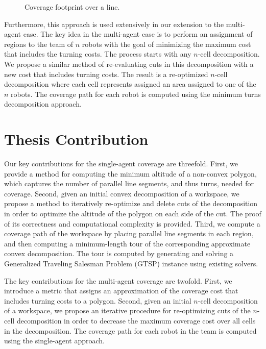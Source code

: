 \documentclass[../main.tex]{subfiles}
\begin{document}
\begin{figure}
	\centering
	
	\caption{Coverage footprint over a line.}
	\label{fig:line_footprint}
\end{figure}

Furthermore, this approach is used extensively in our extension to the multi-agent case. The key idea in the multi-agent case is to perform an assignment of regions to the team of $n$ robots with the goal of minimizing the maximum cost that includes the turning costs. The process starts with any $n$-cell decomposition. We propose a similar method of re-evaluating cuts in this decomposition with a new cost that includes turning costs. The result is a re-optimized $n$-cell decomposition where each cell represents assigned an area assigned to one of the $n$ robots. The coverage path for each robot is computed using the minimum turns decomposition approach.


\section{Thesis Contribution}
\label{section:thesis_contribution}

Our key contributions for the single-agent coverage are threefold. First, we provide a method for computing the minimum altitude of a non-convex polygon, which captures the number of parallel line segments, and thus turns, needed for coverage. Second, given an initial convex decomposition of a workspace, we propose a method to iteratively re-optimize and delete cuts of the decomposition in order to optimize the altitude of the polygon on each side of the cut. The proof of its correctness and computational complexity is provided. Third, we compute a coverage path of the workspace by placing parallel line segments in each region, and then computing a minimum-length tour of the corresponding approximate convex decomposition. The tour is computed by generating and solving a Generalized Traveling Salesman Problem (GTSP) instance using existing solvers.

The key contributions for the multi-agent coverage are twofold. First, we introduce a metric that assigns an approximation of the coverage cost that includes turning costs to a polygon. Second, given an initial $n$-cell decomposition of a workspace, we propose an iterative procedure for re-optimizing cuts of the $n$-cell decomposition in order to decrease the maximum coverage cost over all cells in the decomposition. The coverage path for each robot in the team is computed using the single-agent approach.
\end{document}
